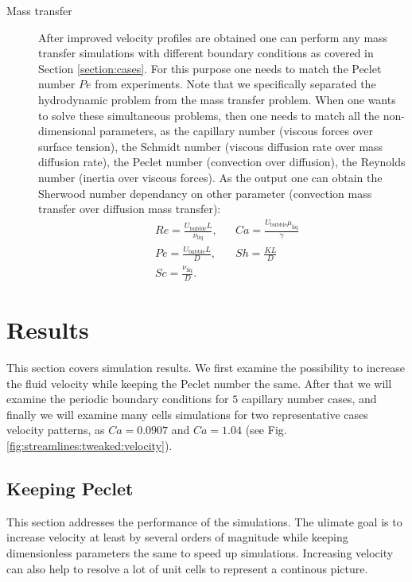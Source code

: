 \documentclass{article}
\newcommand{\ububble}{U_{\mathrm{bubble}}}
\begin{document}
\begin{description}
\item[Mass transfer] After improved velocity profiles are obtained one can perform any mass
transfer simulations with different boundary conditions as covered in Section \ref{section:cases}.
For this purpose one needs to match the Peclet number $Pe$ from experiments. Note that we
specifically separated the hydrodynamic problem from the mass transfer problem. When one wants to
solve these simultaneous problems, then one needs to match all the non-dimensional parameters, as
the capillary number (viscous forces over surface tension), the Schmidt number (viscous diffusion
rate over mass diffusion rate), the Peclet number (convection over diffusion), the Reynolds number
(inertia over viscous forces). As the output one can obtain the Sherwood number dependancy on other
parameter (convection mass transfer over diffusion mass transfer):
\begin{equation}
\begin{aligned}
&Re=\frac{\ububble L}{\nu_{\mathrm{liq}}},&&Ca=\frac{\ububble \mu_{\mathrm{liq}}}{\gamma}\\
&Pe=\frac{\ububble L}{D},&&Sh=\frac{K L}{D}\\
&Sc=\frac{\nu_{\mathrm{liq}}}{D}.&&
\end{aligned}
\end{equation}
\end{description}

\section{Results}
This section covers simulation results. We first examine the possibility to increase the fluid
velocity while keeping the Peclet number the same. After that we will examine the periodic boundary
conditions for $5$ capillary number cases,  and finally we will examine
many
cells simulations for two representative cases velocity patterns, as $Ca=0.0907$ and $Ca=1.04$
(see Fig. \ref{fig:streamlines:tweaked:velocity}). 

\subsection{Keeping Peclet}
\label{section:keeping:peclet}
This section addresses the performance of the simulations. The ulimate goal is to increase
velocity at least by several orders of magnitude while keeping dimensionless parameters the same to
speed up                                      
simulations. Increasing velocity can also help to resolve a lot of unit cells to represent a
continous picture.
\end{document}
